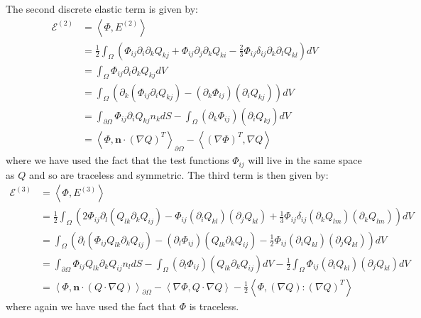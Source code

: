 \documentclass[reqno]{article}
\begin{document}
The second discrete elastic term is given by:
\begin{equation}
    \begin{split}
        \mathcal{E}^{(2)}
        &=
        \left< \Phi, E^{(2)} \right> \\
        &=
        \tfrac12 \int_\Omega \left( \Phi_{ij} \partial_i \partial_k Q_{kj}
        + \Phi_{ij} \partial_j \partial_k Q_{ki}
        - \tfrac23 \Phi_{ij} \delta_{ij} \partial_k \partial_l Q_{kl}
        \right) dV \\
        &=
        \int_\Omega \Phi_{ij} \partial_i \partial_k Q_{kj} dV \\
        &=
        \int_\Omega \left( \partial_k \left( \Phi_{ij} \partial_i Q_{kj} \right)
        - \left(\partial_k \Phi_{ij} \right) \left( \partial_i Q_{kj} \right) \right) dV \\
        &=
        \int_{\partial \Omega} \Phi_{ij} \partial_i Q_{kj} n_k dS
        - \int_\Omega (\partial_k \Phi_{ij}) (\partial_i Q_{kj}) dV \\
        &=
        \left< \Phi, \mathbf{n} \cdot \left( \nabla Q \right)^T \right>_{\partial \Omega}
        - \left< \left( \nabla \Phi \right)^T, \nabla Q \right> 
    \end{split}
\end{equation}
where we have used the fact that the test functions $\Phi_{ij}$ will live in the same space as $Q$ and so are traceless and symmetric.
The third term is then given by:
\begin{equation}
    \begin{split}
        \mathcal{E}^{(3)}
        &=
        \left< \Phi, E^{(3)} \right> \\
        &=
        \tfrac12 \int_\Omega \left( 2 \Phi_{ij} \partial_l (Q_{lk} \partial_k Q_{ij})
        - \Phi_{ij} (\partial_i Q_{kl}) (\partial_j Q_{kl})
        + \tfrac13 \Phi_{ij} \delta_{ij} (\partial_k Q_{lm}) (\partial_k Q_{lm})
        \right) dV \\
        &=
        \int_\Omega \left( \partial_l \left( \Phi_{ij} Q_{lk} \partial_k Q_{ij} \right)
        - (\partial_l \Phi_{ij}) (Q_{lk} \partial_k Q_{ij})
        - \tfrac12 \Phi_{ij} (\partial_i Q_{kl}) (\partial_j Q_{kl})
        \right) dV \\
        &=
        \int_{\partial \Omega}  \Phi_{ij} Q_{lk} \partial_k Q_{ij} n_l dS
        - \int_{\Omega} (\partial_l \Phi_{ij}) (Q_{lk} \partial_k Q_{ij}) dV
        - \tfrac12 \int_\Omega \Phi_{ij} (\partial_i Q_{kl}) (\partial_j Q_{kl}) dV \\
        &=
        \left< \Phi, \mathbf{n} \cdot \left( Q \cdot \nabla Q \right) \right>_{\partial \Omega}
        - \left< \nabla \Phi, Q \cdot \nabla Q \right>
        - \tfrac12 \left< \Phi, (\nabla Q) : (\nabla Q)^T \right>
    \end{split}
\end{equation}
where again we have used the fact that $\Phi$ is traceless.
\end{document}
